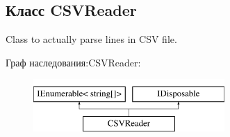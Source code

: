 \subsection{Класс C\+S\+V\+Reader}
\label{classkdz__manager_1_1_c_s_v_reader}


Class to actually parse lines in C\+S\+V file.  


Граф наследования\+:C\+S\+V\+Reader\+:\begin{figure}[H]
\begin{center}
\leavevmode
\includegraphics[height=2.000000cm]{classkdz__manager_1_1_c_s_v_reader}
\end{center}
\end{figure}
